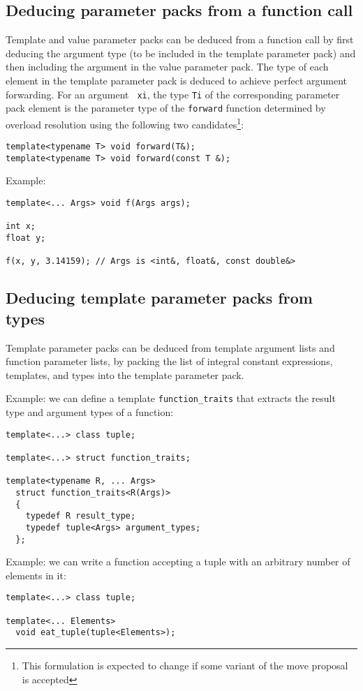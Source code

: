 \documentclass{article}
\begin{document}
\subsection{Deducing parameter packs from a function call}
Template and value parameter packs can be deduced from a function call
by first deducing the argument type (to be included in the template
parameter pack) and then including the argument in the value parameter
pack. The type of each element in the template parameter pack is
deduced to achieve perfect argument forwarding. For an argument {\tt
  xi}, the type {\tt Ti} of the corresponding parameter pack element
is the parameter type of the {\tt forward} function determined by
overload resolution using the following two candidates\footnote{This
  formulation is expected to change if some variant of the move
  proposal~\cite{Hinnant02} is accepted}:
\begin{verbatim}
template<typename T> void forward(T&);
template<typename T> void forward(const T &);
\end{verbatim}

Example:
\begin{verbatim}
template<... Args> void f(Args args);

int x;
float y;

f(x, y, 3.14159); // Args is <int&, float&, const double&>
\end{verbatim}

\subsection{Deducing template parameter packs from types}
Template parameter packs can be deduced from template argument lists
and function parameter lists, by packing the list of integral constant
expressions, templates, and types into the template parameter pack.

Example: we can define a template {\tt function\_traits} that extracts
the result type and argument types of a function:
\begin{verbatim}
template<...> class tuple;

template<...> struct function_traits;

template<typename R, ... Args> 
  struct function_traits<R(Args)>
  { 
    typedef R result_type; 
    typedef tuple<Args> argument_types;
  };
\end{verbatim}

Example: we can write a function accepting a tuple with an arbitrary
number of elements in it:
\begin{verbatim}
template<...> class tuple;

template<... Elements>
  void eat_tuple(tuple<Elements>);
\end{verbatim}
\end{document}
